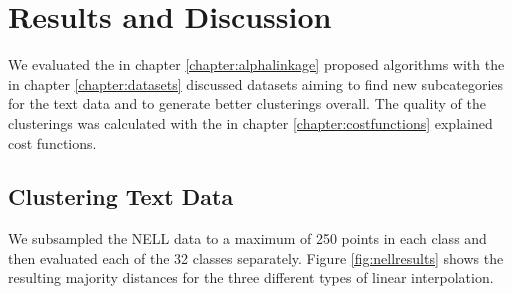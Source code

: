 \chapter{Results and Discussion}
\label{sec:results}

We evaluated the in chapter \ref{chapter:alphalinkage} proposed algorithms with the in chapter \ref{chapter:datasets} discussed datasets aiming to find new subcategories for the text data and to generate better clusterings overall. The quality of the clusterings was calculated with the in chapter \ref{chapter:costfunctions} explained cost functions.

\section{Clustering Text Data}

We subsampled the NELL data to a maximum of 250 points in each class and then evaluated each of the 32 classes separately. Figure \ref{fig:nellresults} shows the resulting majority distances for the three different types of linear interpolation.

